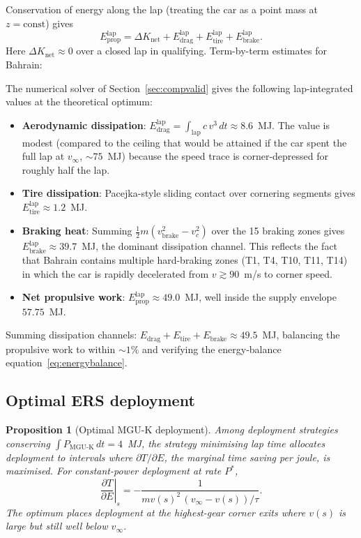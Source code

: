 \documentclass[11pt,twocolumn]{article}
\newtheorem{proposition}[theorem]{Proposition}
\theoremstyle{definition}
\theoremstyle{remark}
\begin{document}
Conservation of energy along the lap (treating the car as a point mass at
$z = \mathrm{const}$) gives
\begin{equation}
  E_{\mathrm{prop}}^{\mathrm{lap}} = \Delta K_{\mathrm{net}}
  + E_{\mathrm{drag}}^{\mathrm{lap}}
  + E_{\mathrm{tire}}^{\mathrm{lap}}
  + E_{\mathrm{brake}}^{\mathrm{lap}}.
  \label{eq:energybalance}
\end{equation}
Here $\Delta K_{\mathrm{net}} \approx 0$ over a closed lap in qualifying.
Term-by-term estimates for Bahrain:

The numerical solver of Section~\ref{sec:compvalid} gives the following
lap-integrated values at the theoretical optimum:
\begin{itemize}[leftmargin=1.5em]
  \item \textbf{Aerodynamic dissipation}:
  $E_{\mathrm{drag}}^{\mathrm{lap}} = \int_{\mathrm{lap}} c\, v^3\, dt
  \approx 8.6$~MJ. The value is modest (compared to the ceiling that would
  be attained if the car spent the full lap at $v_\infty$, $\sim 75$~MJ)
  because the speed trace is corner-depressed for roughly half the lap.
  \item \textbf{Tire dissipation}: Pacejka-style sliding contact over
  cornering segments gives $E_{\mathrm{tire}}^{\mathrm{lap}} \approx 1.2$~MJ.
  \item \textbf{Braking heat}: Summing
  $\tfrac{1}{2}m(v_{\mathrm{brake}}^2 - v_c^2)$ over the 15 braking zones
  gives $E_{\mathrm{brake}}^{\mathrm{lap}} \approx 39.7$~MJ, the dominant
  dissipation channel. This reflects the fact that Bahrain contains
  multiple hard-braking zones (T1, T4, T10, T11, T14) in which the car is
  rapidly decelerated from $v \gtrsim 90$~m/s to corner speed.
  \item \textbf{Net propulsive work}: $E_{\mathrm{prop}}^{\mathrm{lap}}
  \approx 49.0$~MJ, well inside the supply envelope $57.75$~MJ.
\end{itemize}
Summing dissipation channels:
$E_{\mathrm{drag}} + E_{\mathrm{tire}} + E_{\mathrm{brake}} \approx 49.5$~MJ,
balancing the propulsive work to within $\sim 1\%$ and verifying the
energy-balance equation~\eqref{eq:energybalance}.

\subsection{Optimal ERS deployment}

\begin{proposition}[Optimal MGU-K deployment]
\label{prop:ersopt}
Among deployment strategies conserving $\int P_{\mathrm{MGU\text{-}K}}\,dt = 4$~MJ,
the strategy minimising lap time allocates deployment to intervals where
$\partial T / \partial E$, the marginal time saving per joule, is maximised.
For constant-power deployment at rate $P^*$,
\begin{equation}
  \left. \frac{\partial T}{\partial E}\right|_{s}
  = -\frac{1}{m v(s)^2\, (v_\infty - v(s))/\tau}.
  \label{eq:dtdE}
\end{equation}
The optimum places deployment at the highest-gear corner exits where $v(s)$
is large but still well below $v_\infty$.
\end{proposition}
\end{document}

